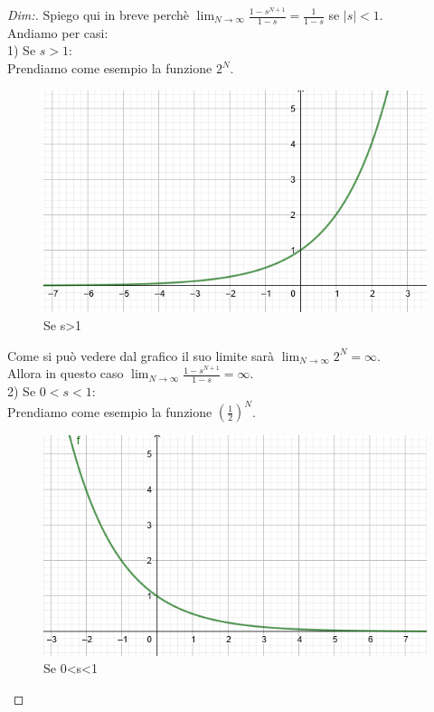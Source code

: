 \begin{proof}[Dim:] Spiego qui in breve perchè $\lim_{N \to \infty} \frac{ 1-s^{N+1} }{ 1-s } = \frac{1}{1-s} $ se $ |s|<1$.\\
	
	Andiamo per casi:\\
	1) Se $ s>1 $:\\
	Prendiamo come esempio la funzione $ 2^N $.\\
	
	\begin{figure}[h]
		\centering
		\includegraphics[scale=0.5]{immagini/esp1}
		\caption{ Se s>1 }
		\label{fig: esp1}
	\end{figure}
	
	\pagebreak
	
	Come si può vedere dal grafico il suo limite sarà $ \lim_{N \to \infty} 2^N = \infty $.\\
	Allora in questo caso $ \lim_{N \to \infty} \frac{ 1-s^{N+1} }{ 1-s } = \infty $.\\
	
	2) Se $ 0<s<1 $:\\
	Prendiamo come esempio la funzione $ (\frac{1}{2})^N $.\\
	
	\begin{figure}[h]
		\centering
		\includegraphics[scale=0.5]{immagini/esp2}
		\caption{ Se 0<s<1 }
		\label{fig: esp2}
	\end{figure}


\end{proof}
